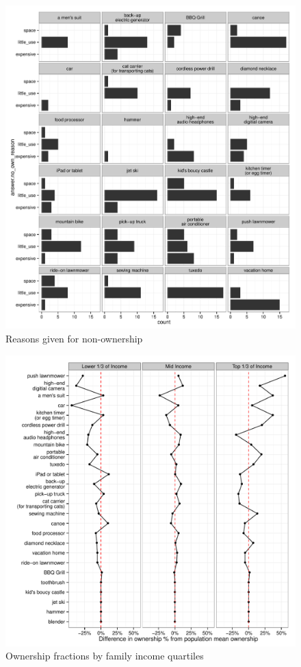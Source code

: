\documentclass[11pt]{article}
\begin{document}
\begin{figure}
\centering 
\caption{Reasons given for non-ownership}
\begin{minipage}{0.90 \linewidth}
\includegraphics[width = \linewidth]{./plots/reasons.pdf} 
\end{minipage} 
\end{figure} 


\begin{figure}
\centering 
\caption{Ownership fractions by family income quartiles}
\begin{minipage}{0.90 \linewidth}
\includegraphics[width = \linewidth]{./plots/ownership_fractions_inc.pdf} 
\end{minipage} 
\end{figure} 
\end{document}
